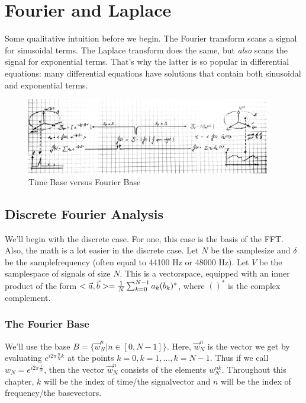 \section{Fourier and Laplace}

Some qualitative intuition before we begin.
The Fourier transform scans a signal for sinusoidal terms.
The Laplace transform does the same, but \emph{also} scans the signal for exponential terms.
That's why the latter is so popular in differential equations: many differential equations have solutions that contain both sinusoidal and exponential terms. 


\begin{figure}[H]
  \caption{Time Base versus Fourier Base}
  \centering
    \includegraphics[width=0.95\textwidth]{images/fourier_base.jpg}
\end{figure}


\subsection{Discrete Fourier Analysis}

We'll begin with the discrete case. For one, this case is the basis of the FFT. Also, the math is a lot easier in the discrete case. Let $N$ be the samplesize and $\delta$ be the samplefrequency (often equal to 44100 Hz or 48000 Hz). Let $V$ be the samplespace of signals of size $N$. This is a vectorspace, equipped with an inner product of the form $< \vec{a} , \vec{b} > = \frac{1}{N} \sum_{k=0}^{N-1} a_k (b_k)^*$, where $()^*$ is the complex complement.

\subsubsection{The Fourier Base}




We'll use the base $B = \{ \vec{w}_N^n | n \in [0, N-1]\}$. Here, $\vec{w}_N^n$ is the vector we get by evaluating $e^{i 2\pi \frac{n}{N} k}$ at the points $k=0, k=1, ..., k=N-1$. Thus if we call $w_N = e^{i 2 \pi \frac{1}{N}}$, then the vector $\vec{w}_N^n$ consists of the elements $w_N^{nk}$. Throughout this chapter, $k$ will be the index of time/the signalvector and $n$ will be the index of frequency/the basevectors.

